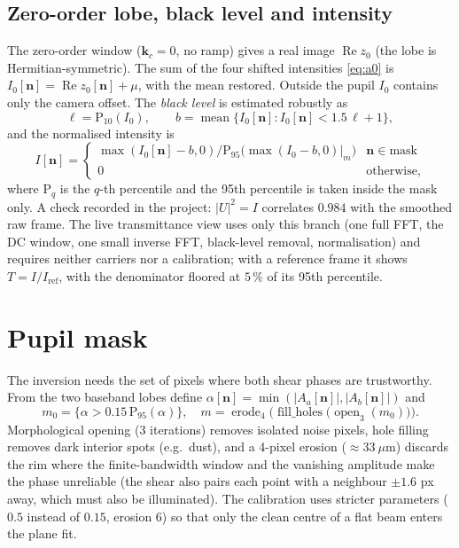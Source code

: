 \documentclass[11pt,a4paper]{article}
\theoremstyle{definition}
\newcommand{\Real}{\operatorname{Re}}
\begin{document}
\subsection{Zero-order lobe, black level and intensity}
\label{sec:intensity}
The zero-order window ($\bm k_c=0$, no ramp) gives a real image $\Real z_0$ (the lobe is Hermitian-symmetric). The sum of the four shifted intensities \eqref{eq:a0} is
$I_0[\bm n]=\Real z_0[\bm n]+\mu$, with the mean restored. Outside the pupil $I_0$ contains only the camera offset. The \emph{black level} is estimated robustly as
\begin{equation}
\ell=\mathrm{P}_{10}(I_0),\qquad b=\operatorname{mean}\{I_0[\bm n]: I_0[\bm n]<1.5\,\ell+1\},
\end{equation}
and the normalised intensity is
\begin{equation}
I[\bm n]=\begin{cases}\max(I_0[\bm n]-b,0)\big/\mathrm{P}_{95}\big(\max(I_0-b,0)\big|_{m}\big)&\bm n\in\text{mask}\\ 0&\text{otherwise,}\end{cases}
\label{eq:I}
\end{equation}
where $\mathrm P_q$ is the $q$-th percentile and the 95th percentile is taken inside the mask only. A check recorded in the project: $|U|^2=I$ correlates $0.984$ with the smoothed raw frame.
The live transmittance view uses only this branch (one full FFT, the DC window, one small inverse FFT, black-level removal, normalisation) and requires neither carriers nor a calibration; with a reference
frame it shows $T=I/I_{\mathrm{ref}}$, with the denominator floored at $5\,\%$ of its 95th percentile.

\section{Pupil mask}
\label{sec:mask}
The inversion needs the set of pixels where both shear phases are trustworthy. From the two baseband lobes define $\alpha[\bm n]=\min(|A_a[\bm n]|,|A_b[\bm n]|)$ and
\begin{equation}
m_0=\{\alpha>0.15\,\mathrm P_{95}(\alpha)\},\quad m=\operatorname{erode}_{4}\!\Big(\operatorname{fill\_holes}\big(\operatorname{open}_{3}(m_0)\big)\Big).
\end{equation}
Morphological opening (3 iterations) removes isolated noise pixels, hole filling removes dark interior spots (e.g.\ dust), and a 4-pixel erosion ($\approx33\ \mu$m) discards the rim where
the finite-bandwidth window and the vanishing amplitude make the phase unreliable (the shear also pairs each point with a neighbour $\pm1.6$ px away, which must also be illuminated). The calibration uses stricter
parameters ($0.5$ instead of $0.15$, erosion $6$) so that only the clean centre of a flat beam enters the plane fit.
\end{document}
